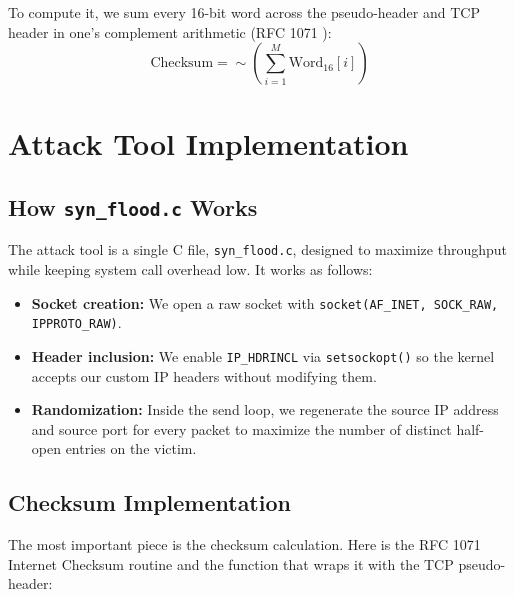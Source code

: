 \documentclass[11pt,a4paper]{report}
\begin{document}
To compute it, we sum every 16-bit word across the pseudo-header and TCP header in one's complement arithmetic (RFC 1071 \cite{rfc1071}):
\begin{equation}
    \text{Checksum} = \sim \left( \sum_{i=1}^{M} \text{Word}_{16}[i] \right)
\end{equation}

\chapter{Attack Tool Implementation}

\section{How \texttt{syn\_flood.c} Works}
The attack tool is a single C file, \texttt{syn\_flood.c}, designed to maximize throughput while keeping system call overhead low. It works as follows:
\begin{itemize}
    \item \textbf{Socket creation:} We open a raw socket with \texttt{socket(AF\_INET, SOCK\_RAW, IPPROTO\_RAW)}.
    \item \textbf{Header inclusion:} We enable \texttt{IP\_HDRINCL} via \texttt{setsockopt()} so the kernel accepts our custom IP headers without modifying them.
    \item \textbf{Randomization:} Inside the send loop, we regenerate the source IP address and source port for every packet to maximize the number of distinct half-open entries on the victim.
\end{itemize}

\section{Checksum Implementation}
The most important piece is the checksum calculation. Here is the RFC 1071 \cite{rfc1071} Internet Checksum routine and the function that wraps it with the TCP pseudo-header:
\end{document}
